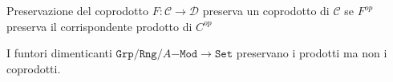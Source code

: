 \begin{definition}{Preservazione del coprodotto}
    \(F: \mathcal{C} \to \mathcal{D}\) preserva un coprodotto di \(\mathcal{C}\) se \(F^{op}\) preserva il
    corrispondente prodotto di \(C^{op}\) 
\end{definition}

\begin{example}{}
    I funtori dimenticanti \(\mathtt{Grp}/\mathtt{Rng}/A\mathtt{-Mod} \to \mathtt{Set}\) preservano i prodotti ma non i coprodotti.
\end{example}






